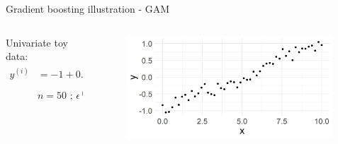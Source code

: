 \documentclass[11pt,compress,t,notes=noshow, xcolor=table]{beamer}
\begin{document}
\begin{vbframe}{Gradient boosting illustration - GAM}
\begin{columns}[c]
\begin{column}{0.5\textwidth}
\footnotesize
Univariate toy data: 
\vspace{-0.2cm}
\begin{align*}
y^{(i)} &=  -1 + 0.2 \cdot x^{(i)} + 0.1 \cdot sin(x^{(i)}) + \epsilon^{(i)} \\
& n = 50 \text{ ; } \epsilon^{(i)} \sim \mathcal{N}(0, 0.1) \quad 
\end{align*}
\end{column}
\begin{column}{0.5\textwidth}
\begin{figure}
  \includegraphics[width = 0.99\textwidth]{figure/illustration_data_normal.png}
\end{figure}
\end{column}
\end{columns}





\end{vbframe}
\end{document}
